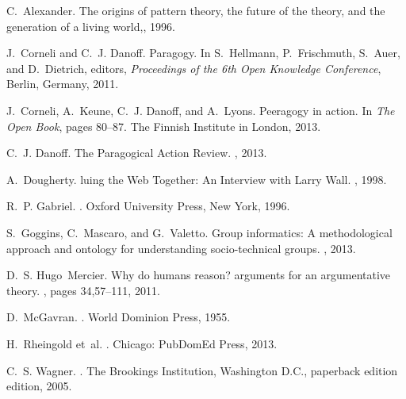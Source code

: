 \documentclass{acm_proc_article-sp}
\begin{document}
\begin{thebibliography}{10}

C.~Alexander.
\newblock The origins of pattern theory, the future of the theory, and the
  generation of a living world,, 1996.

J.~Corneli and C.~J. Danoff.
\newblock Paragogy.
\newblock In S.~Hellmann, P.~Frischmuth, S.~Auer, and D.~Dietrich, editors,
  {\em Proceedings of the 6th Open Knowledge Conference}, Berlin, Germany,
  2011.

J.~Corneli, A.~Keune, C.~J. Danoff, and A.~Lyons.
\newblock Peeragogy in action.
\newblock In {\em The Open Book}, pages 80--87. The Finnish Institute in
  London, 2013.

C.~J. Danoff.
\newblock The {P}aragogical {A}ction {R}eview.
, 2013.

A.~Dougherty.
luing the {W}eb {T}ogether: {A}n {I}nterview with {L}arry {W}all.
, 1998.

R.~P. Gabriel.
.
\newblock Oxford University Press, New York, 1996.

S.~Goggins, C.~Mascaro, and G.~Valetto.
\newblock Group informatics: A methodological approach and ontology for
  understanding socio-technical groups.
, 2013.

D.~S. Hugo~Mercier.
\newblock Why do humans reason? arguments for an argumentative theory.
, pages 34,57--111, 2011.

D.~McGavran.
.
\newblock World Dominion Press, 1955.

H.~Rheingold et~al.
.
\newblock Chicago: PubDomEd Press, 2013.

C.~S. Wagner.
.
\newblock The Brookings Institution, Washington D.C., paperback edition
  edition, 2005.

\end{thebibliography}

\balancecolumns
\end{document}
